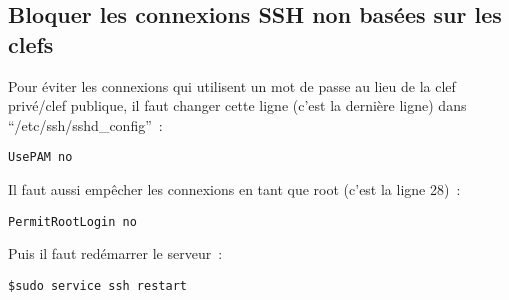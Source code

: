 \subsection{Bloquer les connexions SSH non basées sur les clefs}

Pour éviter les connexions qui utilisent un mot de passe au lieu de la clef privé/clef publique, il faut changer cette ligne (c'est la dernière ligne) dans ``/etc/ssh/sshd\_config''~:

\begin{verbatim}
UsePAM no
\end{verbatim}

Il faut aussi empêcher les connexions en tant que root (c'est la ligne 28)~:
\begin{verbatim}
PermitRootLogin no
\end{verbatim}

Puis il faut redémarrer le serveur~:

\begin{verbatim}
$sudo service ssh restart
\end{verbatim}



